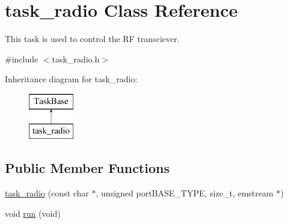 \hypertarget{classtask__radio}{}\section{task\+\_\+radio Class Reference}
\label{classtask__radio}


This task is used to control the RF transciever.  




{\ttfamily \#include $<$task\+\_\+radio.\+h$>$}

Inheritance diagram for task\+\_\+radio\+:\begin{figure}[H]
\begin{center}
\leavevmode
\includegraphics[height=2.000000cm]{classtask__radio}
\end{center}
\end{figure}
\subsection*{Public Member Functions}
\begin{DoxyCompactItemize}
\item 
\mbox{\hyperlink{classtask__radio_ad6d6a721a2642bb3074d682ea880aa30}{task\+\_\+radio}} (const char $\ast$, unsigned port\+B\+A\+S\+E\+\_\+\+T\+Y\+PE, size\+\_\+t, emstream $\ast$)
\item 
void \mbox{\hyperlink{classtask__radio_a4aeed57265c3fd031bd1219a9854811d}{run}} (void)
\end{DoxyCompactItemize}

